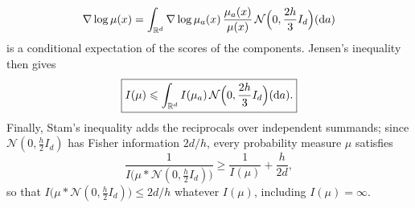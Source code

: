 \documentclass[namedate,webpdf,imanum]{ima-authoring-template}
\newcommand{\Le}{\leqslant}
\newcommand{\Ge}{\geqslant}
\newcommand{\D}{\mathrm{d}}
\theoremstyle{thmstyletwo}
\numberwithin{equation}{section}
\begin{document}
\begin{equation*}
    \nabla \log \mu(x) = \int_{\mathbb R^d} \nabla \log \mu_a(x)\, \frac{\mu_a(x)}{\mu(x)}\, \mathcal N\Bigl( 0, \frac{2h}{3} I_d \Bigr)(\D a)
\end{equation*}
is a conditional expectation of the scores of the components. Jensen's inequality then gives
\begin{equation}
    \boxed{I(\mu) \Le \int_{\mathbb R^d} I(\mu_a)\, \mathcal N\Bigl( 0, \frac{2h}{3} I_d \Bigr)(\D a) .}
    \label{eq: fisher convexity}
\end{equation}
Finally, Stam's inequality \citep{stam1959some, blachman1965convolution} adds the reciprocals over independent summands; since $\mathcal N(0, \frac h2 I_d)$ has Fisher information $2d/h$, every probability measure $\mu$ satisfies
\begin{equation}
    \boxed{\frac{1}{I\bigl( \mu * \mathcal N(0, \frac h2 I_d) \bigr)} \Ge \frac{1}{I(\mu)} + \frac{h}{2d} ,}
    \label{eq: stam}
\end{equation}
so that $I\bigl( \mu * \mathcal N(0, \frac h2 I_d) \bigr) \Le 2d/h$ whatever $I(\mu)$, including $I(\mu) = \infty$.
\end{document}
